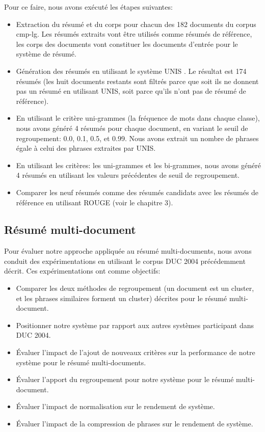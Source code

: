 \documentclass[a4paper,12pt,oneside]{../use/ESIthesis}
\begin{document}
Pour ce faire, nous avons exécuté les étapes suivantes:
\begin{itemize}
\item Extraction du résumé et du corps pour chacun des 182 documents du corpus cmp-lg. 
Les résumés extraits vont être utilisés comme résumés de référence, les corps des documents vont constituer les documents d'entrée pour le système de résumé.
%
\item Génération des résumés en utilisant le système UNIS \cite{10-yatsko-al}.
Le résultat est 174 résumés (les huit documents restants sont filtrés parce que soit ils ne donnent pas un résumé en utilisant UNIS, soit parce qu'ils n'ont pas de résumé de référence).
%
\item En utilisant le critère uni-grammes (la fréquence de mots dans chaque classe), nous avons généré 4 résumés pour chaque document, en variant le seuil de regroupement: 0.0, 0.1, 0.5, et 0.99.
Nous avons extrait un nombre de phrases égale à celui des phrases extraites par UNIS.
%
\item En utilisant les critères: les uni-grammes et les bi-grammes, nous avons généré 4 résumés en utilisant les valeurs précédentes de seuil de regroupement.
%
\item Comparer les neuf résumés comme des résumés candidats avec les résumés de référence en utilisant ROUGE (voir le chapitre 3).
\end{itemize}

\subsection{Résumé multi-document}

Pour évaluer notre approche appliquée au résumé multi-documents, nous avons conduit des expérimentations en utilisant le corpus DUC 2004 précédemment décrit. 
Ces expérimentations ont comme objectifs:
\begin{itemize}
\item Comparer les deux méthodes de regroupement (un document est un cluster, et les phrases similaires forment un cluster) décrites pour le résumé multi-document.
\item Positionner notre système par rapport aux autres systèmes participant dans DUC 2004.
\item Évaluer l'impact de l'ajout de nouveaux critères sur la performance de notre système pour le résumé multi-documents. 
\item Évaluer l'apport du regroupement pour notre système pour le résumé multi-document.
\item Évaluer l'impact de normalisation sur le rendement de système.
\item Évaluer l'impact de la compression de phrases sur le rendement de système.
\end{itemize}
\end{document}
